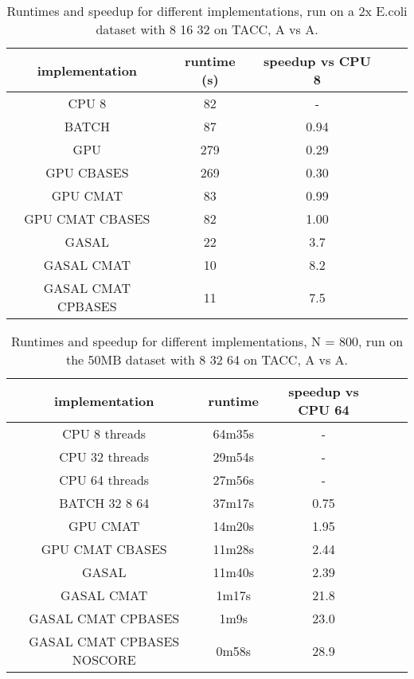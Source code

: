 \documentclass[../thesis.tex]{subfiles}
\begin{document}
\begin{table}[h]
\centering
\caption{Runtimes and speedup for different implementations, run on a 2x E.coli dataset with 8 16 32 on TACC, A vs A.}
\label{tbl:darwin1}
\begin{tabular}{c c c c c}
implementation & runtime (s) & speedup vs CPU 8 \\ \hline
CPU 8 & 82 & -\\
BATCH & 87 & 0.94 \\
GPU & 279 & 0.29 \\
GPU CBASES & 269 & 0.30 \\
GPU CMAT & 83 & 0.99 \\
GPU CMAT CBASES & 82 & 1.00 \\
GASAL & 22 & 3.7 \\
GASAL CMAT & 10 & 8.2 \\
GASAL CMAT CPBASES & 11 & 7.5 \\
\end{tabular}
\end{table}

\begin{table}
\centering
\caption{Runtimes and speedup for different implementations, N = 800, run on the 50MB dataset with 8 32 64 on TACC, A vs A.}
\label{tbl:darwin2}
\begin{tabular}{c c c c c}
implementation & runtime & speedup vs CPU 64 \\ \hline
CPU 8 threads & 64m35s & - \\
CPU 32 threads & 29m54s & - \\
CPU 64 threads & 27m56s & - \\
BATCH 32 8 64 & 37m17s & 0.75 \\
GPU CMAT & 14m20s & 1.95 \\
GPU CMAT CBASES & 11m28s & 2.44 \\
GASAL & 11m40s & 2.39 \\
GASAL CMAT & 1m17s & 21.8 \\
GASAL CMAT CPBASES & 1m9s & 23.0 \\
GASAL CMAT CPBASES NOSCORE & 0m58s & 28.9 \\
\end{tabular}
\end{table}

\end{document}

